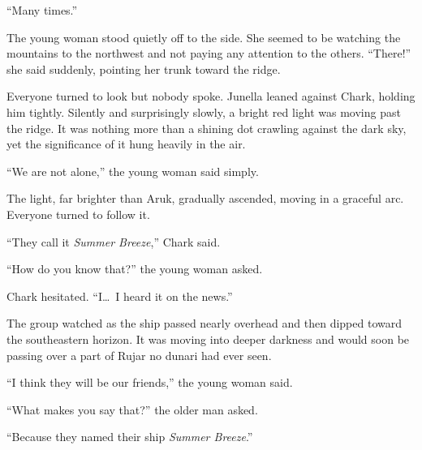 ``Many times.''

The young woman stood quietly off to the side. She seemed to be watching the mountains to the
northwest and not paying any attention to the others. ``There!'' she said suddenly, pointing her
trunk toward the ridge.

Everyone turned to look but nobody spoke. Junella leaned against Chark, holding him tightly.
Silently and surprisingly slowly, a bright red light was moving past the ridge. It was nothing
more than a shining dot crawling against the dark sky, yet the significance of it hung heavily
in the air.

``We are not alone,'' the young woman said simply.


The light, far brighter than Aruk, gradually ascended, moving in a graceful arc. Everyone turned
to follow it.

``They call it \textit{Summer Breeze},'' Chark said.

``How do you know that?'' the young woman asked.

Chark hesitated. ``I\ldots\ I heard it on the news.''

The group watched as the ship passed nearly overhead and then dipped toward the southeastern
horizon. It was moving into deeper darkness and would soon be passing over a part of Rujar no
dunari had ever seen.

``I think they will be our friends,'' the young woman said.

``What makes you say that?'' the older man asked.

``Because they named their ship \textit{Summer Breeze}.''

